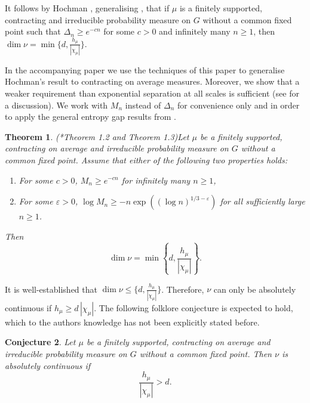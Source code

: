 \documentclass[10pt, english,oneside,reqno]{amsart}
\theoremstyle{plain}
\newtheorem{theorem}{Theorem}[section]
\newtheorem{conjecture}[theorem]{Conjecture}
\theoremstyle{remark}
\numberwithin{equation}{section}
\numberwithin{figure}{section}
\newcommand{\eps}{\varepsilon}
\begin{document}
    It follows by Hochman \cite{Hochman2017}, generalising \cite{Hochman2014}, that if $\mu$ is a finitely supported, contracting and irreducible probability measure on $G$ without a common fixed point such that $\Delta_n \geq e^{-cn}$ for some $c > 0$ and infinitely many $n \geq 1$, then $\dim \nu = \min\{ d, \frac{h_{\mu}}{|\chi_{\mu}|} \}.$ 
    
    In the accompanying paper \cite{KittleKoglerDimension} we use the techniques of this paper to generalise Hochman's result to contracting on average measures. Moreover, we show that a weaker requirement than exponential separation at all scales is sufficient (see \cite{KittleKoglerDimension} for a discussion). We work with $M_n$ instead of $\Delta_n$ for convenience only and in order to apply the general entropy gap results from \cite{KittleKoglerEntropy}.

    \begin{theorem}(\cite{KittleKoglerDimension}*{Theorem 1.2 and Theorem 1.3})\label{GeneralHochman}
        Let $\mu$ be a finitely supported, contracting on average and irreducible probability measure on $G$ without a common fixed point. Assume that either of the following two properties holds:
        \begin{enumerate}[label = (\roman*)]
            \item For some $c > 0$, $M_n \geq e^{-cn}$ for infinitely many $n\geq 1$,
            \item For some $\eps > 0$, $\log M_n \geq -n \exp((\log n)^{1/3 - \eps})$ for all sufficiently large $n\geq 1$.
        \end{enumerate} Then $$\dim \nu = \min\left\{ d, \frac{h_{\mu}}{|\chi_{\mu}|} \right\}.$$
    \end{theorem}

    It is well-established that $\dim \nu \leq \{ d, \frac{h_{\mu}}{|\chi_{\mu}|} \}$. Therefore, $\nu$ can only be absolutely continuous if $ h_{\mu} \geq d\,|\chi_{\mu}|$. The following folklore conjecture is expected to hold, which to the authors knowledge has not been explicitly stated before. 
    
    \begin{conjecture}\label{MainConjecture}
        Let $\mu$ be a finitely supported, contracting on average and irreducible probability measure on $G$ without a common fixed point. Then $\nu$ is absolutely continuous if $$\frac{h_{\mu}}{|\chi_{\mu}|} > d.$$
    \end{conjecture}
    
\end{document}
